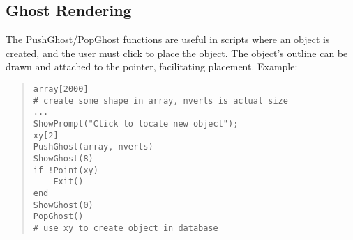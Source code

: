 \subsection{Ghost Rendering}

The {\vt PushGhost/PopGhost} functions are useful in scripts where an
object is created, and the user must click to place the object.  The
object's outline can be drawn and attached to the pointer,
facilitating placement.  Example:

\begin{quote}
\begin{verbatim}
array[2000]
# create some shape in array, nverts is actual size
...
ShowPrompt("Click to locate new object");
xy[2]
PushGhost(array, nverts)
ShowGhost(8)
if !Point(xy)
    Exit()
end
ShowGhost(0)
PopGhost()
# use xy to create object in database
\end{verbatim}
\end{quote}

